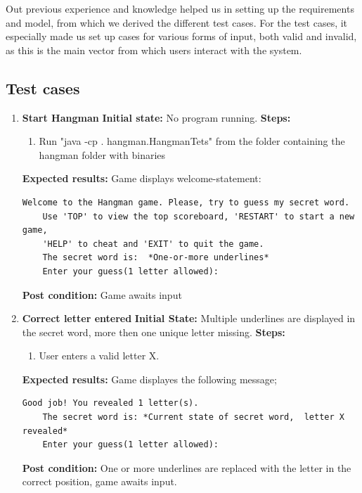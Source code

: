 \documentclass{article}
\begin{document}
	Out previous experience and knowledge helped us in setting up the requirements and model, from which we derived the different test cases. For the test cases, it especially made us set up cases for various forms of input, both valid and invalid, as this is the main vector from which users interact with the system.
\pagebreak

	\subsection{Test cases}
	\begin{enumerate}
	\setlength\itemsep{1em}

	\item \textbf{Start Hangman}\newline
	\textbf{Initial state:} No program running.\newline
	\textbf{Steps:}
	\begin{enumerate}
	\item Run "java -cp . hangman.HangmanTets" from the folder containing the hangman folder with binaries
	\end{enumerate}
	\textbf{Expected results:} Game displays welcome-statement:
	\begin{lstlisting}[breaklines, gobble=8]
	Welcome to the Hangman game. Please, try to guess my secret word.
	Use 'TOP' to view the top scoreboard, 'RESTART' to start a new game, 
	'HELP' to cheat and 'EXIT' to quit the game.
	The secret word is:  *One-or-more underlines*
	Enter your guess(1 letter allowed):
	\end{lstlisting}
	\textbf{Post condition:} Game awaits input

	\item \textbf{Correct letter entered}\newline
	\textbf{Initial State:} Multiple underlines are displayed in the secret word, more then one unique letter missing.\newline
	\textbf{Steps:}
	\begin{enumerate}
	\item User enters a valid letter X.
	\end{enumerate}
	\textbf{Expected results:} Game displayes the following message; 
	\begin{lstlisting}[breaklines, gobble=8]
	Good job! You revealed 1 letter(s).
	The secret word is: *Current state of secret word,  letter X revealed*
	Enter your guess(1 letter allowed):
	\end{lstlisting}
	\textbf{Post condition:} One or more underlines are replaced with the letter in the correct position, game awaits input.


\end{enumerate}
\end{document}
